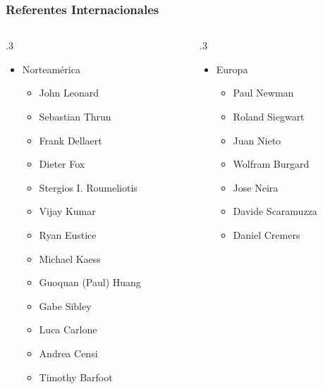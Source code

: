 \begin{frame}
    \frametitle{Referentes Internacionales}
    
    \begin{columns}[T] %
        \begin{column}{.3\textwidth}
            \begin{itemize}
                \item Norteamérica
                \begin{itemize}
                    \item John Leonard
                    \item Sebastian Thrun
                    \item Frank Dellaert
                    \item Dieter Fox
                    \item Stergios I. Roumeliotis
                    \item Vijay Kumar
                    \item Ryan Eustice
                    \item Michael Kaess
                    \item Guoquan (Paul) Huang
                    \item Gabe Sibley
                    \item Luca Carlone
                    \item Andrea Censi
                    \item Timothy Barfoot
                \end{itemize}
            \end{itemize}
        \end{column}%
        \hfill%
        \begin{column}{.3\textwidth}
            \begin{itemize} 
                \item Europa
                \begin{itemize}     
                    \item Paul Newman
                    \item Roland Siegwart
                    \item Juan Nieto
                    \item Wolfram Burgard
                    \item Jose Neira
                    \item Davide Scaramuzza
                    \item Daniel Cremers

\end{itemize}
\end{itemize}
\end{column}
\end{columns}
\end{frame}
